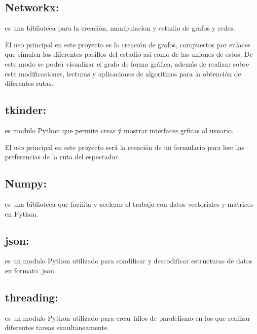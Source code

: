 \documentclass[letterpaper,10pt,spanish]{sphinxmanual}
\begin{document}
\subsection{Networkx:}
\label{\detokenize{Librerias:networkx}}
\sphinxAtStartPar
{} es una biblioteca para la creación, manipulacion y estudio de grafos y redes.

\sphinxAtStartPar
El uso principal en este proyecto es la creación de grafos, compuestos por enlaces que simulen los diferentes pasillos del estadio asi como de las uniones de estos. De este modo
se podrá visualizar el grafo de forma gráfica, además de realizar sobre este modificaciones, lecturas y aplicaciones de algoritmos para la obtención de diferentes rutas.


\subsection{tkinder:}
\label{\detokenize{Librerias:tkinder}}
\sphinxAtStartPar
{} es modulo Python que permite crear ý mostrar interfaces grficas al usuario.

\sphinxAtStartPar
El uso principal en este proyecto será la creación de un formulario para leer las preferencias de la ruta del espectador.


\subsection{Numpy:}
\label{\detokenize{Librerias:numpy}}
\sphinxAtStartPar
{} es una biblioteca que facilita y acelerar el trabajo con datos vectoriales y matrices en Python.


\subsection{json:}
\label{\detokenize{Librerias:json}}
\sphinxAtStartPar
{} es un modulo Python utilizado para condificar y descodificar estructuras de datos en formato .json.


\subsection{threading:}
\label{\detokenize{Librerias:id5}}
\sphinxAtStartPar
{} es un modulo Python utilizado para crear hilos de paralelismo en los que realizar diferentes tareas simultaneamente.
\end{document}
